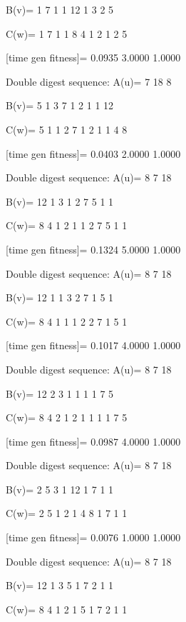 B(v)=
     1     7     1     1    12     1     3     2     5

C(w)=
     1     7     1     1     8     4     1     2     1     2     5

[time gen fitness]=
    0.0935    3.0000    1.0000

Double digest sequence:
A(u)=
     7    18     8

B(v)=
     5     1     3     7     1     2     1     1    12

C(w)=
     5     1     1     2     7     1     2     1     1     4     8

[time gen fitness]=
    0.0403    2.0000    1.0000

Double digest sequence:
A(u)=
     8     7    18

B(v)=
    12     1     3     1     2     7     5     1     1

C(w)=
     8     4     1     2     1     1     2     7     5     1     1

[time gen fitness]=
    0.1324    5.0000    1.0000

Double digest sequence:
A(u)=
     8     7    18

B(v)=
    12     1     1     3     2     7     1     5     1

C(w)=
     8     4     1     1     1     2     2     7     1     5     1

[time gen fitness]=
    0.1017    4.0000    1.0000

Double digest sequence:
A(u)=
     8     7    18

B(v)=
    12     2     3     1     1     1     1     7     5

C(w)=
     8     4     2     1     2     1     1     1     1     7     5

[time gen fitness]=
    0.0987    4.0000    1.0000

Double digest sequence:
A(u)=
     8     7    18

B(v)=
     2     5     3     1    12     1     7     1     1

C(w)=
     2     5     1     2     1     4     8     1     7     1     1

[time gen fitness]=
    0.0076    1.0000    1.0000

Double digest sequence:
A(u)=
     8     7    18

B(v)=
    12     1     3     5     1     7     2     1     1

C(w)=
     8     4     1     2     1     5     1     7     2     1     1

